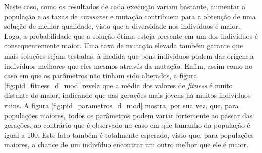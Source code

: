 \begin {enumerate}
	\FloatBarrier
	
	Neste caso, como os resultados de cada execução variam bastante, aumentar a
	população e as taxas de \textit{crossover} e mutação contribuem para a obtenção
	de uma solução de melhor qualidade, visto que a diversidade nos indivíduos é
	maior. Logo, a probabilidade que a solução ótima esteja presente em um dos
	indivíduos é consequentemente maior. Uma taxa de mutação elevada também garante
	que mais soluções sejam testadas, à medida que bons indivíduos podem dar origem
	a indivíduos melhores que eles mesmos através da mutação. Enfim, assim como no
	caso em que os parâmetros não tinham sido alterados, a figura
	\ref{fig:pid_fitness_d_mod} revela que a média dos valores de \textit{fitness}
	é muito distante do maior, indicando que nas gerações mais jovens há muitos
	indivíduos ruins. A figura \ref{fig:pid_parametros_d_mod} mostra, por sua vez,
	que, para populações maiores, todos os parâmetros podem variar fortemente
	ao passar das gerações, ao contrário que é observado no caso em que tamanho da
	população é igual a 100. Este fato também é totalmente esperado, visto que,
	para populações maiores, a chance de um indivíduo encontrar um outro melhor que ele
	é maior.
	
\end{enumerate}
